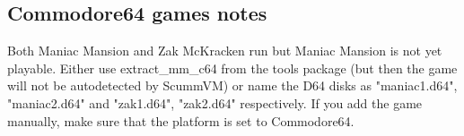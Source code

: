 \subsection{Commodore64 games notes}

Both Maniac Mansion and Zak McKracken run but Maniac Mansion is not yet
playable. Either use extract\_mm\_c64 from the tools package (but then the
game will not be autodetected by ScummVM) or name the D64 disks as
"maniac1.d64", "maniac2.d64" and "zak1.d64", "zak2.d64" respectively.
If you add the game manually, make sure that the platform is set to
Commodore64.



